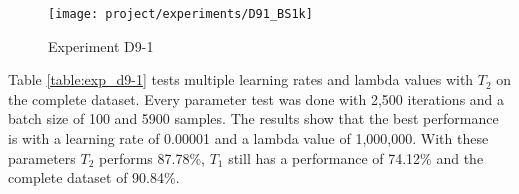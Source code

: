 \begin{figure}[H]
    \centering
    \texttt{[image: project/experiments/D91\_BS1k]}
    \caption{Experiment D9-1}
    \label{fig:exp_d9-1_bs1k}
\end{figure}

\newpage

Table \ref{table:exp_d9-1} tests multiple learning rates and lambda values with $T_2$ on the complete dataset.
Every parameter test was done with 2,500 iterations and a batch size of 100 and 5900 samples.
\newline
The results show that the best performance is with a learning rate of 0.00001 and a lambda value of 1,000,000.
With these parameters $T_2$ performs 87.78\%, $T_1$ still has a performance of 74.12\% and the complete dataset of 90.84\%.

